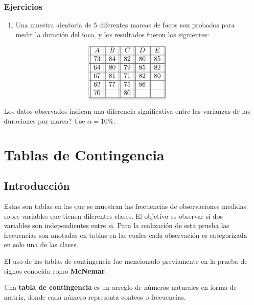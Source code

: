 \documentclass[
  a4paper,
  oneside,
  openany]{book}
\providecommand{\tightlist}{%
  \setlength{\itemsep}{0pt}\setlength{\parskip}{0pt}}
\begin{document}
\hypertarget{ejercicios-8}{%
\section{Ejercicios}\label{ejercicios-8}}

\begin{enumerate}
\def\labelenumi{\arabic{enumi}.}
\tightlist
\item
  Una muestra aleatoria de 5 diferentes marcas de focos son probados para medir la duración del foco, y los resultados fueron los siguientes:
\end{enumerate}

\[
\begin{array}{||c| |c| |c| |c||c||} 
\hline 
A & B&C&D&E \\ 
 \hline
73&84&82&80&85\\
 \hline
64&80&79&85&82\\
 \hline
67&81&71&82&80\\
 \hline
62&77&75&86&\\
 \hline
70&&80&&\\
\hline
\hline
\end{array}
\]

Los datos observados indican una diferencia significativa entre las varianzas de las duraciones por marca? Use \(\alpha=10\%.\)

\hypertarget{part-tablas-de-contingencia}{%
\part{Tablas de Contingencia}\label{part-tablas-de-contingencia}}

\hypertarget{introducciuxf3n-3}{%
\chapter*{Introducción}\label{introducciuxf3n-3}}


Estas son tablas en las que se muestran las frecuencias de observaciones medidas sobre variables que tienen diferentes clases. El objetivo es observar si dos variables son independientes entre si. Para la realización de esta prueba las frecuencias son anotadas en tablas en las cuales cada observación es categorizada en solo una de las clases.

El uso de las tablas de contingencia fue mencionado previamente en la prueba de signos conocida como \textbf{McNemar}.

Una \textbf{tabla de contingencia} es un arreglo de números naturales en forma de matriz, donde cada número representa conteos o frecuencias.
\end{document}
